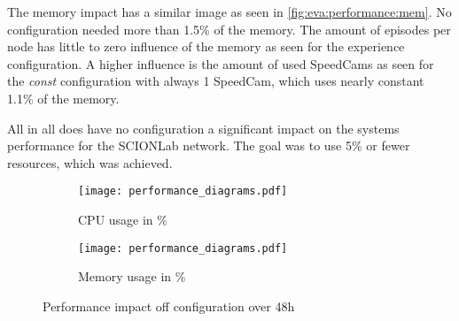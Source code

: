 \documentclass[thesis.tex]{subfiles}
\begin{document}
The memory impact has a similar image as seen in \autoref{fig:eva:performance:mem}. No configuration needed more than 1.5\% of the memory. The amount of episodes per node has little to zero influence of the memory as seen for the experience configuration. A higher influence is the amount of used SpeedCams as seen for the \textit{const} configuration with always 1 SpeedCam, which uses nearly constant 1.1\% of the memory.

All in all does have no configuration a significant impact on the systems performance for the SCIONLab network. The goal was to use 5\% or fewer resources, which was achieved.
\begin{figure}
	\centering
	\begin{subfigure}{.95\linewidth}
		\centering
		\texttt{[image: performance\_diagrams.pdf]}
		\caption{CPU usage in \%}
		\label{fig:eva:performance:cpu}
	\end{subfigure}
\hfill
	\begin{subfigure}{0.95\linewidth}
		\centering
		\texttt{[image: performance\_diagrams.pdf]}
		\caption{Memory usage in \%}
		\label{fig:eva:performance:mem}
	\end{subfigure}
	\caption{Performance impact off configuration over 48h}
	\label{fig:eva:performance}
\end{figure}


\subfilebib %
\end{document}

